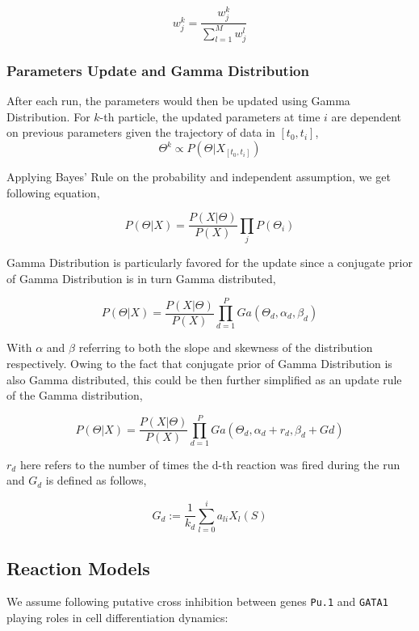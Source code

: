 \documentclass[12pt, oneside]{article}
\begin{document}
$$w_j^k = \frac{w_j^k}{\sum_{l=1}^{M} w_{j}^l}$$

\subsubsection{Parameters Update and Gamma Distribution}

After each run, the parameters would then be updated using Gamma Distribution. For $k$-th particle, the updated parameters at time $i$ are dependent on previous parameters given the trajectory of data in $[t_0, t_i]$,\\

$$\Theta^k \propto P(\Theta | X_{[t_0, t_i]})$$

Applying Bayes' Rule on the probability and independent assumption, we get following equation,

$$P(\Theta | X) = \frac{P(X | \Theta)}{P (X)} \prod_{j} P(\Theta_i)$$

Gamma Distribution is particularly favored for the update since a conjugate prior of Gamma Distribution is in turn Gamma distributed,

$$P(\Theta | X) = \frac{P(X | \Theta)}{P (X)} \prod_{d=1}^{P} Ga(\Theta_d, \alpha_d, \beta_d)$$

With $\alpha$ and $\beta$ referring to both the slope and skewness of the distribution respectively. Owing to the fact that conjugate prior of Gamma Distribution is also Gamma distributed, this could be then further simplified as an update rule of the Gamma distribution,

$$P(\Theta | X) = \frac{P(X | \Theta)}{P (X)} \prod_{d=1}^{P} Ga(\Theta_d, \alpha_d + r_d, \beta_d + Gd)$$

$r_d$ here refers to the number of times the d-th reaction was fired during the run and $G_d$ is defined as follows,

$$G_d := \frac{1}{k_d} \sum_{l=0}^{i} a_{li} X_l(S)$$


\subsection{Reaction Models}

We assume following putative cross inhibition between genes \texttt{Pu.1} and \texttt{GATA1} playing roles in cell differentiation dynamics:
\end{document}
